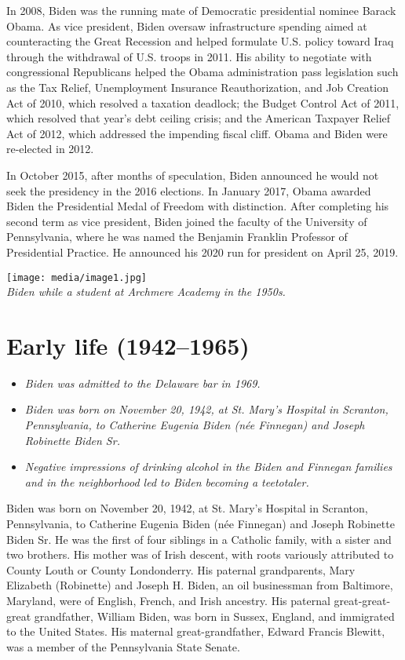 In 2008, Biden was the running mate of Democratic presidential nominee
Barack Obama. As vice president, Biden oversaw infrastructure spending
aimed at counteracting the Great Recession and helped formulate U.S.
policy toward Iraq through the withdrawal of U.S. troops in 2011. His
ability to negotiate with congressional Republicans helped the Obama
administration pass legislation such as the Tax Relief, Unemployment
Insurance Reauthorization, and Job Creation Act of 2010, which resolved
a taxation deadlock; the Budget Control Act of 2011, which resolved that
year's debt ceiling crisis; and the American Taxpayer Relief Act of
2012, which addressed the impending fiscal cliff. Obama and Biden were
re-elected in 2012.

In October 2015, after months of speculation, Biden announced he would
not seek the presidency in the 2016 elections. In January 2017, Obama
awarded Biden the Presidential Medal of Freedom with distinction. After
completing his second term as vice president, Biden joined the faculty
of the University of Pennsylvania, where he was named the Benjamin
Franklin Professor of Presidential Practice. He announced his 2020 run
for president on April 25, 2019.

\texttt{[image: media/image1.jpg]}\\
\emph{Biden while a student at Archmere Academy in the 1950s.}

\section{Early life (1942--1965)}\label{early-life-19421965}

\begin{itemize}
\item
  \emph{Biden was admitted to the Delaware bar in 1969.}
\item
  \emph{Biden was born on November 20, 1942, at St. Mary's Hospital in
  Scranton, Pennsylvania, to Catherine Eugenia Biden (née Finnegan) and
  Joseph Robinette Biden Sr.}
\item
  \emph{Negative impressions of drinking alcohol in the Biden and
  Finnegan families and in the neighborhood led to Biden becoming a
  teetotaler.}
\end{itemize}

Biden was born on November 20, 1942, at St. Mary's Hospital in Scranton,
Pennsylvania, to Catherine Eugenia Biden (née Finnegan) and Joseph
Robinette Biden Sr. He was the first of four siblings in a Catholic
family, with a sister and two brothers. His mother was of Irish descent,
with roots variously attributed to County Louth or County Londonderry.
His paternal grandparents, Mary Elizabeth (Robinette) and Joseph H.
Biden, an oil businessman from Baltimore, Maryland, were of English,
French, and Irish ancestry. His paternal great-great-great grandfather,
William Biden, was born in Sussex, England, and immigrated to the United
States. His maternal great-grandfather, Edward Francis Blewitt, was a
member of the Pennsylvania State Senate.


